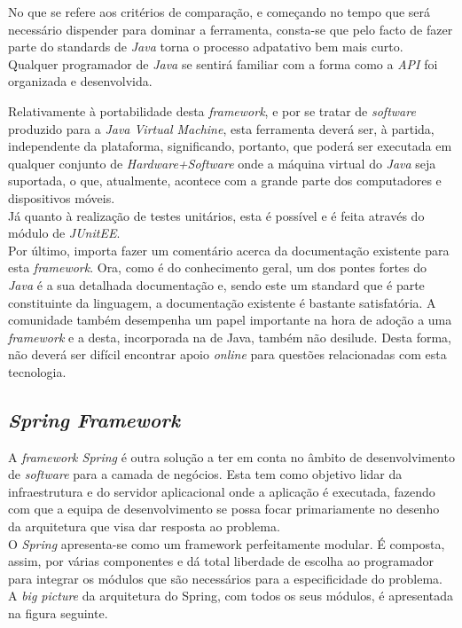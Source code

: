 No que se refere aos critérios de comparação, e começando no tempo que será necessário dispender para dominar a ferramenta, consta-se que pelo facto de fazer parte do standards de \textit{Java} torna o processo adpatativo bem mais curto.
Qualquer programador de \textit{Java} se sentirá familiar com a forma como a \textit{API} foi organizada e desenvolvida.\\

\newpage

Relativamente à portabilidade desta \textit{framework}, e por se tratar de \textit{software} produzido para a \textit{Java Virtual Machine}, esta ferramenta deverá ser, à partida, independente da plataforma, significando, portanto, que poderá ser executada em qualquer conjunto de \textit{Hardware+Software} onde a máquina virtual do \textit{Java} seja suportada, o que, atualmente, acontece com a grande parte dos computadores e dispositivos móveis.\\

Já quanto à realização de testes unitários, esta é possível e é feita através do módulo de \textit{JUnitEE}.\\

Por último, importa fazer um comentário acerca da documentação existente para esta \textit{framework}.
Ora, como é do conhecimento geral, um dos pontes fortes do \textit{Java} é a sua detalhada documentação e, sendo este um standard que é parte constituinte da linguagem, a documentação existente é bastante satisfatória.
A comunidade também desempenha um papel importante na hora de adoção a uma \textit{framework} e a desta, incorporada na de Java, também não desilude.
Desta forma, não deverá ser difícil encontrar apoio \textit{online} para questões relacionadas com esta tecnologia.

\subsection{\textit{Spring Framework}}

A \textit{framework Spring} é outra solução a ter em conta no âmbito de desenvolvimento de \textit{software} para a camada de negócios.
Esta tem como objetivo lidar da infraestrutura e do servidor aplicacional onde a aplicação é executada, fazendo com que a equipa de desenvolvimento se possa focar primariamente no desenho da arquitetura que visa dar resposta ao problema.\\

O \textit{Spring} apresenta-se como um framework perfeitamente modular.
É composta, assim, por várias componentes e dá total liberdade de escolha ao programador para integrar os módulos que são necessários para a especificidade do problema.
A \textit{big picture} da arquitetura do Spring, com todos os seus módulos, é apresentada na figura seguinte.\\

